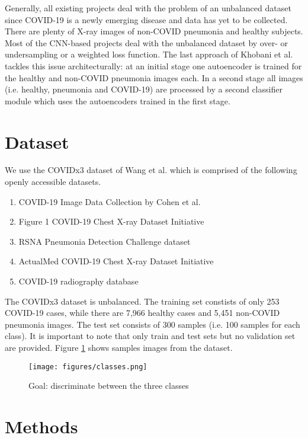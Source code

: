 \documentclass[conference]{IEEEtran}
\begin{document}
Generally, all existing projects deal with the problem of an unbalanced dataset since COVID-19 is a newly emerging disease and data has yet to be collected. There are plenty of X-ray images of non-COVID pneumonia and healthy subjects. Most of the CNN-based projects deal with the unbalanced dataset by over- or undersampling or a weighted loss function. The last approach of Khobani et al. tackles this issue architecturally: at an initial stage one autoencoder is trained for the healthy and non-COVID pneumonia images each. In a second stage all images (i.e. healthy, pneumonia and COVID-19) are processed by a second classifier module which uses the autoencoders trained in the first stage.

\label{chap3_data}
\section{Dataset}
We use the COVIDx3 dataset of Wang et al. \cite{wang2020covid} which is comprised of the following openly accessible datasets.
\begin{enumerate}
    \item COVID-19 Image Data Collection by Cohen et al. \cite{cohen2020covid}
    \item Figure 1 COVID-19 Chest X-ray Dataset Initiative \cite{chung2020figure}
    \item RSNA Pneumonia Detection Challenge dataset \cite{kaggle2019pneumonia}
    \item ActualMed COVID-19 Chest X-ray Dataset Initiative \cite{chung2019covid}
    \item COVID-19 radiography database \cite{kaggle2019covid}
\end{enumerate}

The COVIDx3 dataset is unbalanced. The training set constists of only 253 COVID-19 cases, while there are 7,966 healthy cases and 5,451 non-COVID pneumonia images. The test set consists of 300 samples (i.e. 100 samples for each class). It is important to note that only train and test sets but no validation set are provided. Figure \ref{fig:classes} shows samples images from the dataset.

\begin{figure}
	\centering
	\texttt{[image: figures/classes.png]}
	\caption{Goal: discriminate between the three classes}
	\label{fig:classes}
\end{figure}

\label{chap3_methods}
\section{Methods}
\end{document}
